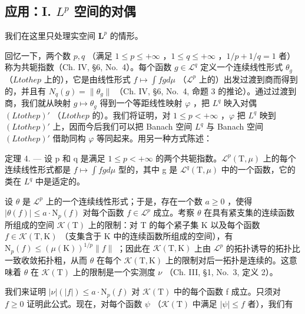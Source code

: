 \subsection{\texorpdfstring{应用：I. \(L^{p}\) 空间的对偶}{应用：I. L to the p 空间的对偶}}

我们在这里只处理实空间 \(\mathbf{L}^p\) 的情形。

回忆一下，两个数 \(p, q\) （满足 \(1 \leqslant p \leqslant +\infty\) ，\(1 \leqslant q \leqslant +\infty\) ，\(1/p + 1/q = 1\) 者）称为共轭指数（Ch. IV, §6, No.~4）。每个函数 \(g \in \mathcal{L}^q\) 定义一个连续线性形式 \(\theta_g\) （\(L to the p\) 上的），它是由线性形式 \(f \mapsto \int fg d\mu\) （\(\mathcal{L}^p\) 上的）出发过渡到商而得到的，并且有 \(N_q(g) = \| \theta_g \|\) （Ch. IV, §6, No.~4, 命题 3 的推论）。通过过渡到商，我们就从映射 \(g \mapsto \theta_g\) 得到一个等距线性映射 \(\varphi\) ，把 \(L^q\) 映入对偶 \((L to the p)'\) （\(L to the p\) 的）。我们将证明，对 \(1 \leqslant p < +\infty\) ，\(\varphi\) 把 \(L^q\) 映到 \((L to the p)'\) 上，因而今后我们可以把 Banach 空间 \(L^q\) 与 Banach 空间 \((L to the p)'\) 借助同构 \(\varphi\) 等同起来。用另一种方式陈述：

定理 4. --- 设 p 和 q 是满足 \(1 \leqslant p < +\infty\) 的两个共轭指数。\(\mathcal{L}^{p}(\mathrm{T}, \mu)\) 上的每个连续线性形式都是 \(f \mapsto \int fg d\mu\) 型的，其中 g 是 \(\mathcal{L}^{q}(\mathrm{T}, \mu)\) 中的一个函数，它的类在 \(L^{q}\) 中是适定的。

设 \(\theta\) 是 \(\mathcal{L}^p\) 上的一个连续线性形式；于是，存在一个数 \(a \geqslant 0\) ，使得 \(|\theta(f)| \leqslant a \cdot \mathrm{N}_p(f)\) 对每个函数 \(f \in \mathcal{L}^p\) 成立。考察 \(\theta\) 在具有紧支集的连续函数所组成的空间 \(\mathcal{K}(\mathrm{T})\) 上的限制：对 T 的每个紧子集 K 以及每个函数 \(f \in \mathcal{K}(\mathrm{T}, \mathrm{K})\) （支集含于 K 中的连续函数所组成的空间），有 \(\mathrm{N}_p(f) \leqslant (\mu(\mathrm{K}))^{1/p} \| f \|\) ；因此在 \(\mathcal{K}(\mathrm{T}, \mathrm{K})\) 上由 \(\mathcal{L}^p\) 的拓扑诱导的拓扑比一致收敛拓扑粗，从而 \(\theta\) 在每个 \(\mathcal{K}(\mathrm{T}, \mathrm{K})\) 上的限制对后一拓扑是连续的。这意味着 \(\theta\) 在 \(\mathcal{K}(\mathrm{T})\) 上的限制是一个实测度 \(\nu\) （Ch. III, §1, No.~3, 定义 2）。

我们来证明 \(|\nu|(|f|) \leqslant a \cdot \mathrm{N}_{p}(f)\) 对 \(\mathcal{K}(\mathrm{T})\) 中的每个函数 f 成立。只须对 \(f \geqslant 0\) 证明此公式。现在，对每个函数 \(\psi\) （\(\mathcal{K}(\mathrm{T})\) 中满足 \(|\psi| \leqslant f\) 者），我们有

